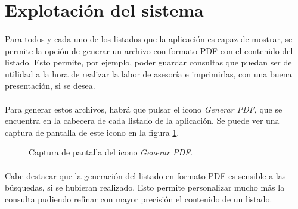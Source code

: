\section{Explotación del sistema}

  \paragraph{}Para todos y cada uno de los listados que la aplicación es capaz
  de mostrar, se permite la opción de generar un archivo con formato PDF con el
  contenido del listado. Esto permite, por ejemplo, poder guardar consultas que
  puedan ser de utilidad a la hora de realizar la labor de asesoría e
  imprimirlas, con una buena presentación, si se desea.

  \paragraph{}Para generar estos archivos, habrá que pulsar el icono
  \textit{Generar PDF}, que se encuentra en la cabecera de cada listado de
  la aplicación. Se puede ver una captura de pantalla de este icono en la figura
  \ref{capturaPantallaGenerarPDF}.

  \begin{figure}[!ht]
    \begin{center}
      \caption{Captura de pantalla del icono \textit{Generar PDF}.}
      \label{capturaPantallaGenerarPDF}
    \end{center}
  \end{figure}

  \paragraph{}Cabe destacar que la generación del listado en formato PDF es
  sensible a las búsquedas, si se hubieran realizado. Esto permite personalizar
  mucho más la consulta pudiendo refinar con mayor precisión el contenido de un
  listado.
